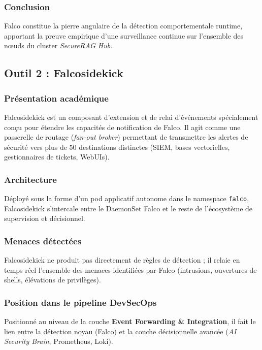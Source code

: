 \subsubsection{Conclusion}
Falco constitue la pierre angulaire de la détection comportementale runtime, apportant la preuve empirique d'une surveillance continue sur l'ensemble des nœuds du cluster \textit{SecureRAG Hub}.

\subsection{Outil 2 : Falcosidekick}
\label{subsec:outil_falcosidekick}

\subsubsection{Présentation académique}
Falcosidekick est un composant d'extension et de relai d'événements spécialement conçu pour étendre les capacités de notification de Falco. Il agit comme une passerelle de routage (\textit{fan-out broker}) permettant de transmettre les alertes de sécurité vers plus de 50 destinations distinctes (SIEM, bases vectorielles, gestionnaires de tickets, WebUIs).

\subsubsection{Architecture}
Déployé sous la forme d'un pod applicatif autonome dans le namespace \texttt{falco}, Falcosidekick s'intercale entre le DaemonSet Falco et le reste de l'écosystème de supervision et décisionnel.

\subsubsection{Menaces détectées}
Falcosidekick ne produit pas directement de règles de détection ; il relaie en temps réel l'ensemble des menaces identifiées par Falco (intrusions, ouvertures de shells, élévations de privilèges).

\subsubsection{Position dans le pipeline DevSecOps}
Positionné au niveau de la couche \textbf{Event Forwarding \& Integration}, il fait le lien entre la détection noyau (Falco) et la couche décisionnelle avancée (\textit{AI Security Brain}, Prometheus, Loki).

